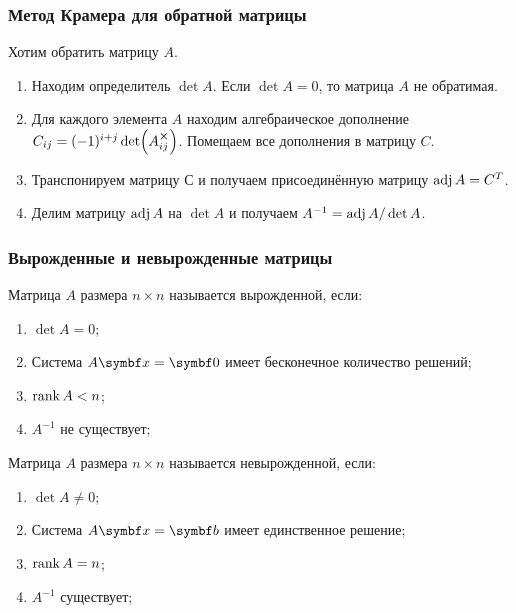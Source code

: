 \begin{frame}
        \frametitle{Метод Крамера для обратной матрицы}
    
        Хотим обратить матрицу $A$.

        \begin{enumerate}
            \item Находим определитель $\det A$. Если $\det A = 0$, то матрица $A$ не обратимая. \pause
            \item Для каждого элемента $A$ находим алгебраическое дополнение $C_{ij} = (-1)^{i+j}\det (A_{ij}^{\cross})$.
            Помещаем все дополнения в матрицу $C$. \pause
            \item Транспонируем матрицу $С$ и получаем \alert{присоединённую матрицу} $\operatorname{adj} A = C^T$.  \pause
            \item Делим матрицу $\operatorname{adj} A$ на $\det A$ и получаем $A^{-1} = \operatorname{adj} A/\det A$.
        \end{enumerate}
        
    
\end{frame}


\begin{frame}
    \frametitle{Вырожденные и невырожденные матрицы}

    Матрица $A$ размера $n\times n$ называется \alert{вырожденной}, если:

    \begin{enumerate}
        \item $\det A = 0$; \pause
        \item Система $A \bx = \bzero$ имеет бесконечное количество решений; \pause
        \item $\rank A < n$; \pause
        \item $A^{-1}$ не существует; \pause
    \end{enumerate}

Матрица $A$ размера $n\times n$ называется \alert{невырожденной}, если:

\begin{enumerate}
    \item $\det A \neq 0$; \pause
    \item Система $A \bx = \bb$ имеет единственное решение; \pause
    \item $\rank A = n$; \pause
    \item $A^{-1}$ существует;
\end{enumerate}


\end{frame}